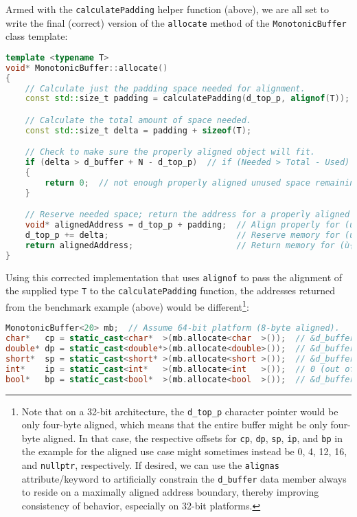 \noindent Armed with the
\texttt{calculatePadding} helper function (above), we are all set to write the final (correct) version of the \texttt{allocate} method of the \texttt{MonotonicBuffer} class template:

\begin{lstlisting}[language=C++]
template <typename T>
void* MonotonicBuffer::allocate()
{
    // Calculate just the padding space needed for alignment.
    const std::size_t padding = calculatePadding(d_top_p, alignof(T));

    // Calculate the total amount of space needed.
    const std::size_t delta = padding + sizeof(T);

    // Check to make sure the properly aligned object will fit.
    if (delta > d_buffer + N - d_top_p)  // if (Needed > Total - Used)
    {
        return 0;  // not enough properly aligned unused space remaining
    }

    // Reserve needed space; return the address for a properly aligned object.
    void* alignedAddress = d_top_p + padding;  // Align properly for (ù{\codeincomments{T}}ù) object.
    d_top_p += delta;                          // Reserve memory for (ù{\codeincomments{T}}ù) object.
    return alignedAddress;                     // Return memory for (ù{\codeincomments{T}}ù) object.
}
\end{lstlisting}
    
\noindent Using this corrected implementation that uses \texttt{alignof} to pass
the alignment of the supplied type \texttt{T} to the
\texttt{calculatePadding} function, the addresses returned from the
benchmark example (above) would be different{\cprotect\footnote{Note
that on a 32-bit architecture, the \texttt{d\_top\_p} character
pointer would be only four-byte aligned, which means that the entire
buffer might be only four-byte aligned. In that case, the respective
offsets for \texttt{cp}, \texttt{dp}, \texttt{sp}, \texttt{ip}, and
\texttt{bp} in the example for the aligned use case might sometimes
instead be 0, 4, 12, 16, and \texttt{nullptr}, respectively. If
  desired, we can use the \texttt{alignas}
  attribute/keyword to artificially constrain the \texttt{d\_buffer}
  data member always to reside on a maximally aligned address boundary,
  thereby improving consistency of behavior, especially on 32-bit
  platforms.}}:

\begin{lstlisting}[language=C++]
MonotonicBuffer<20> mb;  // Assume 64-bit platform (8-byte aligned).
char*   cp = static_cast<char*  >(mb.allocate<char  >());  // &d_buffer[ 0]
double* dp = static_cast<double*>(mb.allocate<double>());  // &d_buffer[ 8]
short*  sp = static_cast<short* >(mb.allocate<short >());  // &d_buffer[16]
int*    ip = static_cast<int*   >(mb.allocate<int   >());  // 0 (out of space)
bool*   bp = static_cast<bool*  >(mb.allocate<bool  >());  // &d_buffer[18]
\end{lstlisting}
    
